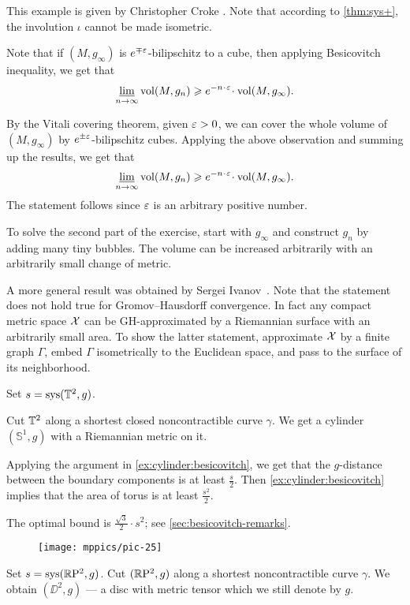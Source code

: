  This example is given by Christopher Croke \cite{croke}.
Note that according to \ref{thm:sys+}, 
the involution $\iota$ cannot be made isometric.

Note that if $(M,g_\infty)$ is $e^{\mp\varepsilon}$-bilipschitz to a cube, then applying Besicovitch inequality, we get that 
\[\liminf_{n\to\infty} \vol (M,g_n)\ge e^{-n\cdot \eps}\cdot\vol (M,g_\infty).\]

By the Vitali covering theorem, given $\varepsilon>0$, we can cover the whole volume of $(M,g_\infty)$ by $e^{\pm\varepsilon}$-bilipschitz cubes.
Applying the above observation and summing up the results, we get that 
\[\liminf_{n\to\infty} \vol (M,g_n)\ge e^{-n\cdot \eps}\cdot\vol (M,g_\infty).\]
The statement follows since $\varepsilon$ is an arbitrary positive number.

To solve the second part of the exercise, start with $g_\infty$ and construct $g_n$ by  adding many tiny bubbles.
The volume can be increased arbitrarily with an arbitrarily small change of metric.

A more general result was obtained by Sergei Ivanov~\cite{ivanov-1997}.
Note that the statement does not hold true for Gromov--Hausdorff convergence.
In fact any compact metric space $\mathcal{X}$ can be GH-approximated by a Riemannian surface with an arbitrarily small area.
To show the latter statement, approximate $\mathcal{X}$ by a finite graph $\Gamma$, embed $\Gamma$ isometrically to the Euclidean space, and pass to the surface of its neighborhood.

Set $s=\mathop{\rm sys}\nolimits(\mathbb{T}^2,g)$.

Cut $\mathbb{T}^2$ along a shortest closed noncontractible curve $\gamma$.
We get a cylinder $(\mathbb{S}^1,g)$ with a Riemannian metric on it.

Applying the argument in \ref{ex:cylinder:besicovitch}, we get that the $g$-distance between the boundary components is at least $\tfrac s2$.
Then \ref{ex:cylinder:besicovitch} implies that the area of torus is at least $\tfrac{s^2}2$.

The optimal bound is $\tfrac{\sqrt{3}}{2}\cdot s^2$; see  \ref{sec:besicovitch-remarks}.

\begin{wrapfigure}{r}{44 mm}
\vskip-4mm
\centering
\texttt{[image: mppics/pic-25]}
\end{wrapfigure}

Set $s\z=\sys (\RP^2,g)$.
Cut $(\mathbb{R}\mathrm{P}^2,g)$ along a shortest noncontractible curve $\gamma$.
We obtain $(\DD^2,g)$ --- a disc with metric tensor which we still denote by $g$.

